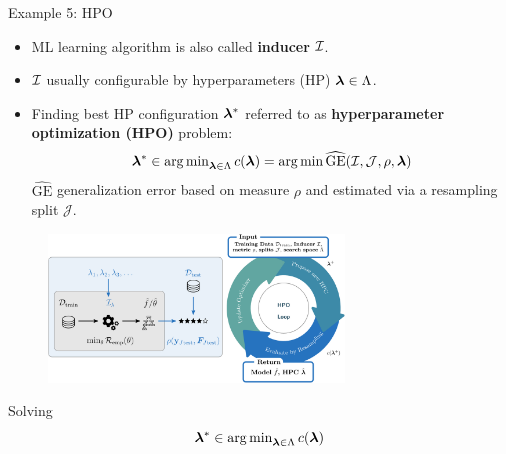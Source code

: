 \documentclass[11pt,compress,t,notes=noshow, xcolor=table]{beamer}
\begin{document}
\begin{vbframe}{Example 5: HPO}
\vspace*{-0.2cm}
\begin{itemize}
	\item ML learning algorithm is also called \textbf{inducer} $\mathcal{I}$.
	\item $\mathcal{I}$ usually configurable by hyperparameters (HP) $\bm{\lambda} \in \Lambda$. 
	\item Finding best HP configuration $\bm{\lambda}^\ast$ referred to as \textbf{hyperparameter optimization (HPO)} problem: 
	$$
	\bm{\lambda}^\ast \in \operatorname{arg\,min}\nolimits_{\bm{\lambda} \in \Lambda} c(\bm{\lambda}) = \operatorname{arg\,min} \widehat{\text{GE}}(\mathcal{I}, \mathcal{J}, \rho, \bm{\lambda})
	$$
	$\widehat{\text{GE}}$ generalization error based on measure $\rho$ and estimated via a resampling split $\mathcal{J}$. 
\end{itemize}

\vspace*{-0.2cm}

\begin{figure}[h]
	\centering
	\includegraphics[width = 0.7\textwidth]{figure_man/hpo_loop_1.png}
\end{figure}

\framebreak 
		
Solving 
\vspace*{-0.2cm}
$$
\bm{\lambda}^\ast \in \operatorname{arg\,min}_{\bm{\lambda} \in \Lambda} c(\bm{\lambda})
$$


\end{vbframe}
\end{document}
